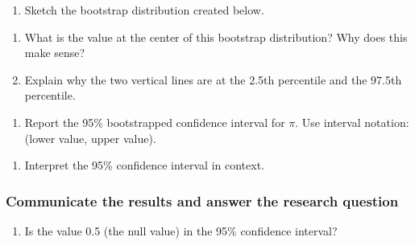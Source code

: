\documentclass[
]{report}
\providecommand{\tightlist}{%
  \setlength{\itemsep}{0pt}\setlength{\parskip}{0pt}}
\begin{document}
\newpage

\begin{enumerate}
\def\labelenumi{\arabic{enumi}.}
\setcounter{enumi}{7}
\tightlist
\item
  Sketch the bootstrap distribution created below.
\end{enumerate}

\vspace{1.8in}

\begin{enumerate}
\def\labelenumi{\arabic{enumi}.}
\setcounter{enumi}{8}
\item
  What is the value at the center of this bootstrap distribution? Why does this make sense?
  \vspace{.8in}
\item
  Explain why the two vertical lines are at the 2.5th percentile and the 97.5th percentile.
\end{enumerate}

\vspace{.4in}

\begin{enumerate}
\def\labelenumi{\arabic{enumi}.}
\setcounter{enumi}{10}
\tightlist
\item
  Report the 95\% bootstrapped confidence interval for \(\pi\). Use interval notation: (lower value, upper value).
\end{enumerate}

\vspace{0.2in}

\begin{enumerate}
\def\labelenumi{\arabic{enumi}.}
\setcounter{enumi}{11}
\tightlist
\item
  Interpret the 95\% confidence interval in context.
\end{enumerate}

\vspace{.6in}

\subsubsection*{Communicate the results and answer the research question}\label{communicate-the-results-and-answer-the-research-question-1}

\begin{enumerate}
\def\labelenumi{\arabic{enumi}.}
\setcounter{enumi}{12}
\tightlist
\item
  Is the value 0.5 (the null value) in the 95\% confidence interval?
\end{enumerate}
\end{document}
